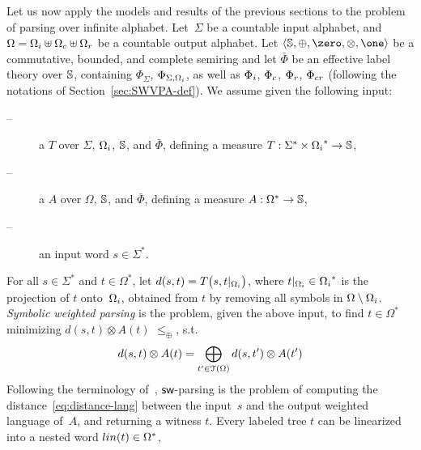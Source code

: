 Let us now apply the models and results of the previous sections %
to the problem of parsing over infinite alphabet. %
%
%
Let~$\Sigma$ be a countable input alphabet, 
and~$\Omega = \Omegai \uplus \Omegac \uplus \Omegar$ be a countable output alphabet.
%
Let $\< \Semiring, \oplus, \zero, \otimes, \one>$ be a 
commutative, bounded, and complete  semiring  
and let $\bar\Phi$ be an effective label theory over $\mathbb{S}$,
containing $\Phi_\Sigma$, $\Phi_{\Sigma, \Omegai}$, as well as
$\Phii$, $\Phic$, $\Phir$, $\Phicr$
(following the notations of Section~\ref{sec:SWVPA-def}).
%
\noindent
We assume given the following input:
\begin{description}
\item[--] a \SWT $T$ over $\Sigma$, $\Omegai$, $\mathbb{S}$, and $\bar\Phi$, 
defining a measure %
$T: \Sigma^* \times \Omegai^* \to \Semiring$,

\item[--] a \SWVPA $A$ over $\Omega$, $\mathbb{S}$, and $\bar\Phi$,
defining a measure $A: \Omega^* \to \mathbb{S}$,
\item[--] an input word $s \in \Sigma^*$.
\end{description}
%
For all $s \in \Sigma^*$ and $t \in \Omega^*$, let 
\(d(s, t) = T\bigl(s, t|_\Omegai \bigr)\), 
where $t|_\Omegai \in \Omegai^*$ is the projection of $t$ onto~$\Omegai$,
obtained from $t$ by removing all symbols in $\Omega \setminus \Omegai$.
%
\noindent 
\emph{Symbolic weighted parsing} is the problem, 
given the above input, 
to find $t \in \Omega^*$ %
minimizing \( d(s, t) \otimes A(t)\)
\wrt $\leq_\oplus$, 
\ie s.t. %
%
\begin{equation}\label{eq:distance-lang}
d(s, t) \otimes A(t) = \displaystyle\bigoplus_{t' \in \mathcal{T}(\Omega)} d(s, t') \otimes A(t') 
\end{equation}
%
Following the terminology of~\cite{Mohri03EDWA}, 
$\textsf{sw}$-parsing is the problem of computing  
the distance~\eqref{eq:distance-lang} between the input~$s$ and the output weighted language of~$A$,
and returning a witness $t$. 
%
Every labeled tree $t$ can be linearized into a nested word $\lin(t) \in \Omega^*$, 
